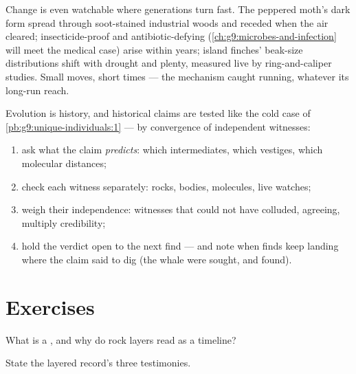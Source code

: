 \begin{example}\label{ex:g9:evidence-of-evolution:live}
Change is even watchable where generations turn fast.
The peppered moth's dark form spread through soot-stained
industrial woods and receded when the air cleared;
insecticide-proof  and antibiotic-defying 
(\cref{ch:g9:microbes-and-infection} will meet the
medical case) arise within years; island finches'
beak-size distributions shift with drought and plenty,
measured live by ring-and-caliper studies. Small moves,
short times --- the mechanism caught running, whatever
its long-run reach.
\end{example}

\begin{method}\label{met:g9:evidence-of-evolution:weigh}
Evolution is history, and historical claims are tested
like the cold case of
\cref{pb:g9:unique-individuals:1} --- by convergence of
independent witnesses:
\begin{enumerate}
  \item ask what the claim \emph{predicts}: which
        intermediates, which vestiges, which molecular
        distances;
  \item check each witness separately: rocks, bodies,
        molecules, live watches;
  \item weigh their independence: witnesses that could
        not have colluded, agreeing, multiply
        credibility;
  \item hold the verdict open to the next find --- and
        note when finds keep landing where the claim
        said to dig (the whale  were sought, and
        found).
\end{enumerate}
\end{method}

\section{Exercises}

\begin{exercise}[$\star$]\label{exo:g9:evidence-of-evolution:1}
What is a , and why do rock layers read as a
timeline?
\end{exercise}

\begin{exercise}[$\star$]\label{exo:g9:evidence-of-evolution:2}
State the layered record's three testimonies.
\end{exercise}

